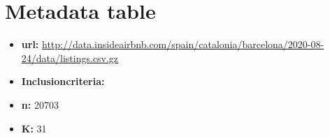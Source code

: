 

\section*{Metadata table}


\begin{multicols}{2}
\begin{itemize}
         \item \textbf{url:} \url{http://data.insideairbnb.com/spain/catalonia/barcelona/2020-08-24/data/listings.csv.gz}
         \item \textbf{Inclusioncriteria:}
\columnbreak
         \item \textbf{n:} 20703
         \item \textbf{K:} 31
\end{itemize}
\end{multicols}

